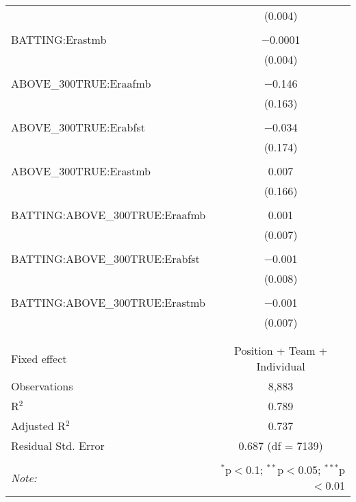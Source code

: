 \begin{table}[!htbp]
\begin{tabular}{@{\extracolsep{5pt}}lc}
  & (0.004) \\
  & \\
 BATTING:Erastmb & $-$0.0001 \\
  & (0.004) \\
  & \\
 ABOVE\_300TRUE:Eraafmb & $-$0.146 \\
  & (0.163) \\
  & \\
 ABOVE\_300TRUE:Erabfst & $-$0.034 \\
  & (0.174) \\
  & \\
 ABOVE\_300TRUE:Erastmb & 0.007 \\
  & (0.166) \\
  & \\
 BATTING:ABOVE\_300TRUE:Eraafmb & 0.001 \\
  & (0.007) \\
  & \\
 BATTING:ABOVE\_300TRUE:Erabfst & $-$0.001 \\
  & (0.008) \\
  & \\
 BATTING:ABOVE\_300TRUE:Erastmb & $-$0.001 \\
  & (0.007) \\
  & \\
\hline \\[-1.8ex]
Fixed effect & Position + Team + Individual \\
Observations & 8,883 \\
R$^{2}$ & 0.789 \\
Adjusted R$^{2}$ & 0.737 \\
Residual Std. Error & 0.687 (df = 7139) \\
\hline
\hline \\[-1.8ex]
\textit{Note:}  & \multicolumn{1}{r}{$^{*}$p$<$0.1; $^{**}$p$<$0.05; $^{***}$p$<$0.01} \\
\end{tabular}
\end{table}

